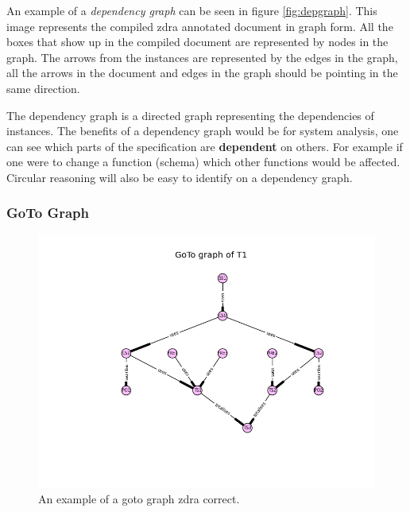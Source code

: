 An example of a \emph{dependency graph} can be seen in figure
\ref{fig:depgraph}. This image represents the compiled \gls{zdra} annotated
document in graph form. All the boxes that show up in the compiled document
are represented by nodes in the graph. The arrows from the instances are
represented by the edges in the graph, all the arrows in the document and edges
in the graph should be pointing in the same direction.

The dependency graph is a directed graph representing the dependencies
of instances. The benefits of a dependency graph would be for system analysis, one can see
which parts of the specification are \textbf{dependent} on others. For example
if one were to change a function (schema) which other functions would be
affected. Circular reasoning will also be easy to identify on a dependency graph.


\subsubsection{GoTo Graph}

\begin{figure}[H]
\centering
\includegraphics[scale=0.6]{Figures/zdra/gotograph.png}
\caption{An example of a goto graph \gls{zdra} correct. \label{fig:gotograph}}
\end{figure}

